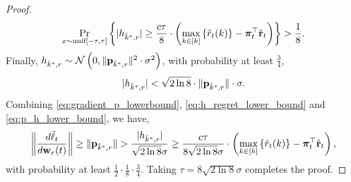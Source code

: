 \begin{proof}
\begin{equation}
\label{eq:h_regret_lower_bound}
\begin{split}
	\operatorname*{Pr}\limits_{x \sim  {\text{unif}}[-\tau, \tau]}\left\{ |  h_{\hat{k}^*,r} | \ge \frac{c\tau}{8} \cdot \left( \max\limits_{k \in \left[k\right]}\left\{ \hat{r}_t(k) \right\} - {\boldsymbol{\pi}}_t^\top \hat{{\mathbf{r}}}_t  \right) \right\} > \frac{1}{8}.
\end{split}
\end{equation}
Finally, $h_{\hat{k}^*,r} \sim {\mathcal{N}}\left( 0, \| {\mathbf{p}}_{\hat{k}^*, r} \|^2 \cdot \sigma^2 \right)$, with probability at least $\frac{3}{4}$,
\begin{equation}
\label{eq:p_h_lower_bound}
\begin{split}
	| h_{\hat{k}^*,r} | < \sqrt{2 \ln{8}} \cdot \| {\mathbf{p}}_{\hat{k}^*, r} \| \cdot \sigma.
\end{split}
\end{equation}
Combining \cref{eq:gradient_p_lowerbound}, \cref{eq:h_regret_lower_bound} and \cref{eq:p_h_lower_bound}, we have,
\begin{equation*}
\begin{split}
	\left\| \frac{d\tilde{\ell}_t}{d {\mathbf{w}}_r(t)} \right\| \ge \| {\mathbf{p}}_{\hat{k}^*, r}\| > \frac{| h_{\hat{k}^*,r} |}{\sqrt{2 \ln{8}} \sigma} \ge \frac{c\tau}{8 \sqrt{2 \ln{8}} \sigma} \cdot \left( \max\limits_{k \in \left[h\right]}\left\{ \hat{r}_t(k) \right\} - {\boldsymbol{\pi}}_t^\top \hat{{\mathbf{r}}}_t  \right),
\end{split}
\end{equation*}
with probability at least $\frac{1}{2}  \cdot \frac{1}{8} \cdot \frac{3}{4} $. Taking $\tau = 8 \sqrt{2 \ln{8}} \sigma$ completes the proof.
\end{proof}

